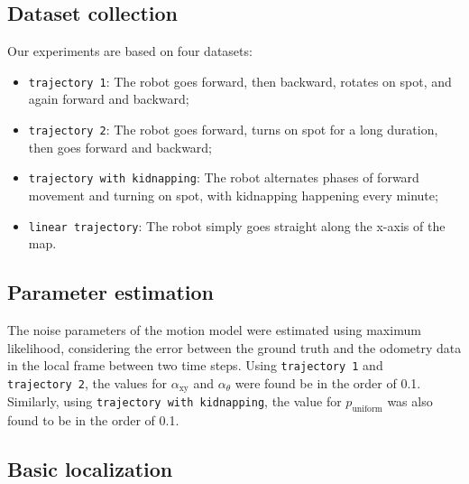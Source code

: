 \documentclass[letterpaper, 10pt, conference]{ieeeconf}
\begin{document}
\subsection{Dataset collection}

Our experiments are based on four datasets:
\begin{itemize}
\item \texttt{trajectory~1}: The robot goes forward, then backward, rotates on spot, and again forward and backward;
\item \texttt{trajectory~2}: The robot goes forward, turns on spot for a long duration, then goes forward and backward;
\item \texttt{trajectory with kidnapping}: The robot alternates phases of forward movement and turning on spot, with kidnapping happening every minute;
\item \texttt{linear trajectory}: The robot simply goes straight along the x-axis of the map.
\end{itemize}

\subsection{Parameter estimation}
\label{sec:mle}

The noise parameters of the motion model were estimated using maximum likelihood, considering the error between the ground truth and the odometry data in the local frame between two time steps.
Using \texttt{trajectory~1} and \texttt{trajectory~2}, the values for  $\alpha_\mathrm{xy}$ and $\alpha_\theta$ were found be in the order of 0.1.
Similarly, using \texttt{trajectory with kidnapping}, the value for $p_\mathrm{uniform}$ was also found to be in the order of 0.1.

\subsection{Basic localization}
\end{document}
